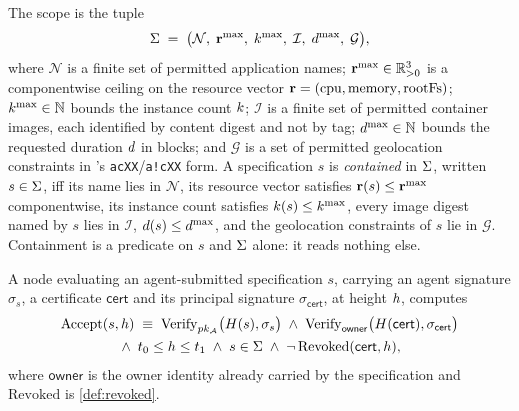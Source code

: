 \begin{definition}
\label{def:scope}
The scope is the tuple
\[
  \Sigma \;=\; \bigl(\mathcal{N},\; \mathbf{r}^{\max},\; k^{\max},\; \mathcal{I},\;
  d^{\max},\; \mathcal{G}\bigr),
\]
where $\mathcal{N}$ is a finite set of permitted application names;
$\mathbf{r}^{\max} \in \mathbb{R}^3_{>0}$ is a componentwise ceiling on the resource vector
$\mathbf{r} = (\text{cpu}, \text{memory}, \text{rootFs})$;
$k^{\max} \in \mathbb{N}$ bounds the instance count $k$;
$\mathcal{I}$ is a finite set of permitted container images, each identified by content digest and
not by tag;
$d^{\max} \in \mathbb{N}$ bounds the requested duration $d$ in blocks;
and $\mathcal{G}$ is a set of permitted geolocation constraints in \FluxOS's \texttt{acXX}\slash\texttt{a!cXX}
form.
A specification $s$ is \emph{contained} in $\Sigma$, written $s \in \Sigma$, iff its name lies
in $\mathcal{N}$, its resource vector satisfies $\mathbf{r}(s) \le \mathbf{r}^{\max}$ componentwise, its
instance count satisfies $k(s) \le k^{\max}$, every image digest named by $s$ lies in
$\mathcal{I}$, $d(s) \le d^{\max}$, and the geolocation constraints of $s$ lie in $\mathcal{G}$.
Containment is a predicate on $s$ and $\Sigma$ alone: it reads nothing else.
\end{definition}

\begin{definition}[Acceptance]
\label{def:accept}
A node evaluating an agent-submitted specification $s$, carrying an agent signature $\sigma_s$, a
certificate $\mathsf{cert}$ and its principal signature $\sigma_{\mathsf{cert}}$, at height $h$,
computes
\begin{multline*}
  \mathrm{Accept}(s,h) \;\equiv\;
  \mathrm{Verify}_{pk_{\mathcal{A}}}\bigl(H(s), \sigma_s\bigr) \;\wedge\;
  \mathrm{Verify}_{\mathsf{owner}}\bigl(H(\mathsf{cert}), \sigma_{\mathsf{cert}}\bigr) \\
  {}\wedge\; t_0 \le h \le t_1 \;\wedge\;
  s \in \Sigma \;\wedge\;
  \neg\,\mathrm{Revoked}(\mathsf{cert},h),
\end{multline*}
where $\mathsf{owner}$ is the owner identity already carried by the specification and
$\mathrm{Revoked}$ is \cref{def:revoked}.
\end{definition}

